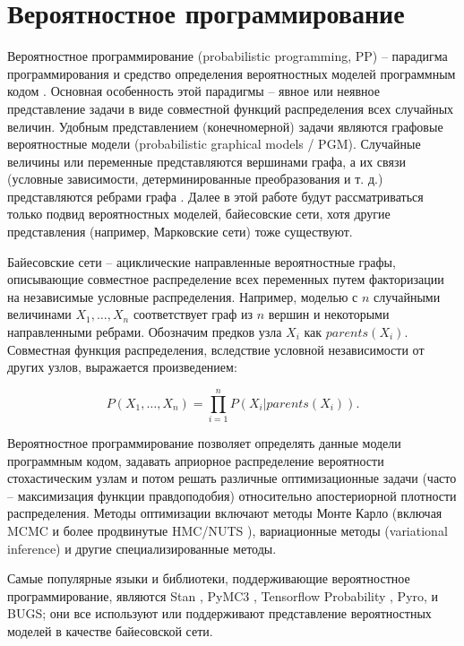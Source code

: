 \documentclass[a4paper,14pt]{extreport}
\begin{document}
\section{Вероятностное программирование}

Вероятностное программирование (probabilistic programming, PP) -- парадигма программирования и средство определения вероятностных моделей программным кодом \cite{intro_to_pp}. Основная особенность этой парадигмы – явное или неявное представление задачи в виде совместной функций распределения всех случайных величин. Удобным представлением (конечномерной) задачи являются графовые вероятностные модели (probabilistic graphical models / PGM). Случайные величины или переменные представляются вершинами графа, а их связи (условные зависимости, детерминированные преобразования и т. д.) представляются ребрами графа \cite{intro_to_pp}. Далее в этой работе будут рассматриваться только подвид вероятностных моделей, байесовские сети, хотя другие представления (например, Марковские сети) тоже существуют.

Байесовские сети -- ациклические направленные вероятностные графы, описывающие совместное распределение всех переменных путем факторизации на независимые условные распределения. Например, моделью с $n$ случайными величинами $X_1, \dots, X_n$ соответствует граф из $n$ вершин и некоторыми направленными ребрами. Обозначим предков узла $X_i$ как $\mathit{parents}(X_i)$. Совместная функция распределения, вследствие условной независимости от других узлов, выражается произведением:

\begin{equation}
	P(X_1, \dots, X_n) = \prod_{i=1}^{n}{P(X_i | \mathit{parents}(X_i))} .
\end{equation}

Вероятностное программирование позволяет определять данные модели программным кодом, задавать априорное распределение вероятности стохастическим узлам и потом решать различные оптимизационные задачи (часто -- максимизация функции правдоподобия) относительно апостериорной плотности распределения. Методы оптимизации включают методы Монте Карло (включая MCMC и более продвинутые HMC/NUTS \cite{nuts_hoffman_gelman}), вариационные методы (variational inference) и другие специализированные методы.

Самые популярные языки и библиотеки, поддерживающие вероятностное программирование, являются Stan \cite{stan_overview}, PyMC3 \cite{pymc3_2016}, Tensorflow Probability \cite{tfp_distributions}, Pyro, и BUGS; они все используют или поддерживают представление вероятностных моделей в качестве байесовской сети.
\end{document}
